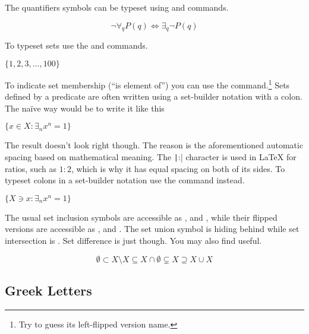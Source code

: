 The quantifiers symbols can be typeset using  and 
commands.
\begin{example}
\[
  \lnot\forall_{q} P(q) \iff
  \exists_{q}\lnot P(q)
\]
\end{example}

To typeset sets use the \csi{\{} and \csi{\}} commands.
\begin{example}
\(\{1, 2, 3, \ldots, 100\}\)
\end{example}
To indicate set membership (\enquote{is element of}) you can use the 
command.\footnote{Try to guess its left-flipped version name.} Sets defined by
a predicate are often written using a set-builder notation with a colon. The
naïve way would be to write it like this
\begin{example}
\( \{x \in X:
  \exists_n x^n = 1\} \)
\end{example}
The result doesn't look right though. The reason is the aforementioned
automatic spacing based on mathematical meaning. The \texttt|:|
character is used in \LaTeX{} for ratios, such as \(1:2\), which is why it has
equal spacing on both of its sides. To typeset colons in a set-builder notation
use the  command instead.
\begin{example}
\(\{ X \ni x\colon
  \exists_n x^n = 1\} \)
\end{example}

The usual set inclusion symbols are accessible as , 
and , while their flipped versions are accessible as
,  and . The set union symbol is
hiding behind  while set intersection is . Set difference is
just  though. You may also find  useful.
\begin{example}
\RenewDocumentCommand{\setminus}{}{\smallsetminus}
\[
  \emptyset
  \subset X \setminus X
  \subseteq X \cap \emptyset
  \subsetneq X
  \supseteq X \cup X
\]
\end{example}

\subsection{Greek Letters}

